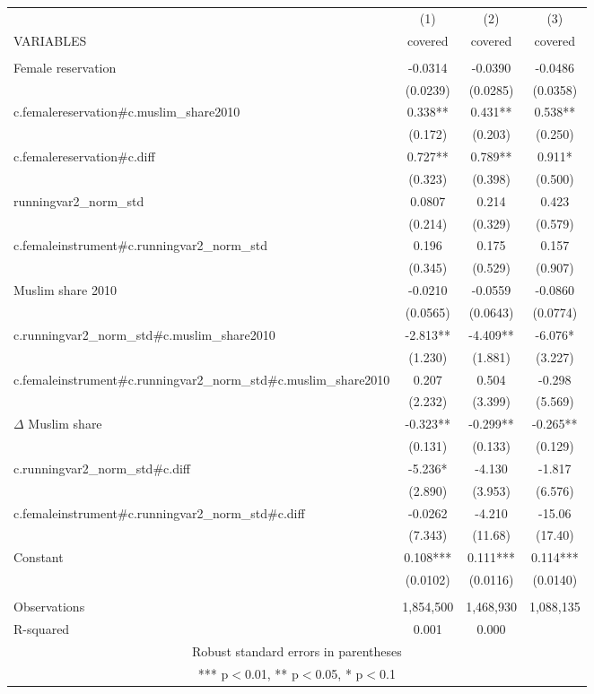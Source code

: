 \begin{tabular}{lccc} \hline
 & (1) & (2) & (3) \\
VARIABLES & covered & covered & covered \\ \hline
 &  &  &  \\
Female reservation & -0.0314 & -0.0390 & -0.0486 \\
 & (0.0239) & (0.0285) & (0.0358) \\
c.femalereservation\#c.muslim\_share2010 & 0.338** & 0.431** & 0.538** \\
 & (0.172) & (0.203) & (0.250) \\
c.femalereservation\#c.diff & 0.727** & 0.789** & 0.911* \\
 & (0.323) & (0.398) & (0.500) \\
runningvar2\_norm\_std & 0.0807 & 0.214 & 0.423 \\
 & (0.214) & (0.329) & (0.579) \\
c.femaleinstrument\#c.runningvar2\_norm\_std & 0.196 & 0.175 & 0.157 \\
 & (0.345) & (0.529) & (0.907) \\
Muslim share 2010 & -0.0210 & -0.0559 & -0.0860 \\
 & (0.0565) & (0.0643) & (0.0774) \\
c.runningvar2\_norm\_std\#c.muslim\_share2010 & -2.813** & -4.409** & -6.076* \\
 & (1.230) & (1.881) & (3.227) \\
c.femaleinstrument\#c.runningvar2\_norm\_std\#c.muslim\_share2010 & 0.207 & 0.504 & -0.298 \\
 & (2.232) & (3.399) & (5.569) \\
$\Delta$ Muslim share & -0.323** & -0.299** & -0.265** \\
 & (0.131) & (0.133) & (0.129) \\
c.runningvar2\_norm\_std\#c.diff & -5.236* & -4.130 & -1.817 \\
 & (2.890) & (3.953) & (6.576) \\
c.femaleinstrument\#c.runningvar2\_norm\_std\#c.diff & -0.0262 & -4.210 & -15.06 \\
 & (7.343) & (11.68) & (17.40) \\
Constant & 0.108*** & 0.111*** & 0.114*** \\
 & (0.0102) & (0.0116) & (0.0140) \\
 &  &  &  \\
Observations & 1,854,500 & 1,468,930 & 1,088,135 \\
 R-squared & 0.001 & 0.000 &  \\ \hline
\multicolumn{4}{c}{ Robust standard errors in parentheses} \\
\multicolumn{4}{c}{ *** p$<$0.01, ** p$<$0.05, * p$<$0.1} \\
\end{tabular}
